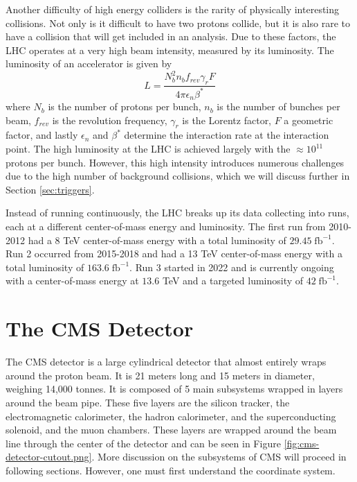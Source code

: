 Another difficulty of high energy colliders is the rarity of physically interesting collisions. Not only is it difficult to have two protons collide, but it is also rare to have a collision that will get included in an analysis. Due to these factors, the LHC operates at a very high beam intensity, measured by its luminosity. The luminosity of an accelerator is given by
\begin{equation}
    L = \frac{N_b^2n_b f_{rev} \gamma_r F}{4 \pi \epsilon_n \beta^*}
\label{eq:luminosity}
\end{equation}
where $N_b$ is the number of protons per bunch, $n_b$ is the number of bunches per beam, $f_{rev}$ is the revolution frequency, $\gamma_r$ is the Lorentz factor, $F$ a geometric factor, and lastly $\epsilon_n$ and $\beta^*$ determine the interaction rate at the interaction point. The high luminosity at the LHC is achieved largely with the $\approx 10^{11}$ protons per bunch. However, this high intensity introduces numerous challenges due to the high number of background collisions, which we will discuss further in Section \ref{sec:triggers}.

Instead of running continuously, the LHC breaks up its data collecting into runs, each at a different center-of-mass energy and luminosity. The first run from 2010-2012 had a 8 TeV center-of-mass energy with a total luminosity of $29.45 \; \text{fb}^{-1}$. Run 2 occurred from 2015-2018 and had a 13 TeV center-of-mass energy with a total luminosity of $163.6 \; \text{fb}^{-1}$. Run 3 started in 2022 and is currently ongoing with a center-of-mass energy at $13.6$ TeV and a targeted luminosity of $42 \; \text{fb}^{-1}$. 

\section{The CMS Detector}

The CMS detector is a large cylindrical detector that almost entirely wraps around the proton beam. It is 21 meters long and 15 meters in diameter, weighing 14,000 tonnes. It is composed of 5 main subsystems wrapped in layers around the beam pipe. These five layers are the silicon tracker, the electromagnetic calorimeter, the hadron calorimeter, and the superconducting solenoid, and the muon chambers. These layers are wrapped around the beam line through the center of the detector and can be seen in Figure \ref{fig:cms-detector-cutout.png}. More discussion on the subsystems of CMS will proceed in following sections. However, one must first understand the coordinate system.

